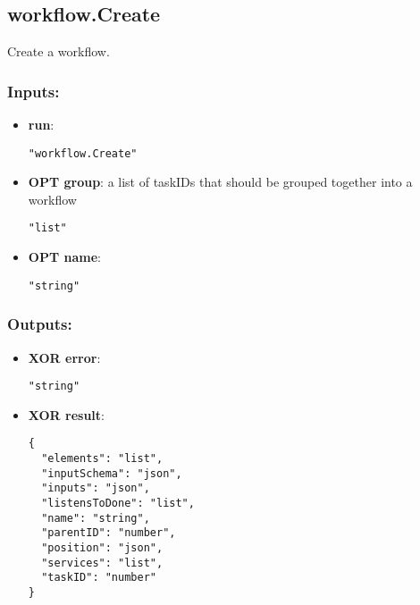 \subsection{workflow.Create}
Create a workflow.
\subsubsection*{Inputs:}
\begin{itemize}
    \item \textbf{run}: 
\begin{lstlisting}
"workflow.Create"
\end{lstlisting}
    \item \textbf{OPT group}: a list of taskIDs that should be grouped together into a workflow
\begin{lstlisting}
"list"
\end{lstlisting}
    \item \textbf{OPT name}: 
\begin{lstlisting}
"string"
\end{lstlisting}
  \end{itemize}

\subsubsection*{Outputs:}
\begin{itemize}
    \item \textbf{XOR error}: 
\begin{lstlisting}
"string"
\end{lstlisting}
    \item \textbf{XOR result}: 
\begin{lstlisting}
{
  "elements": "list", 
  "inputSchema": "json", 
  "inputs": "json", 
  "listensToDone": "list", 
  "name": "string", 
  "parentID": "number", 
  "position": "json", 
  "services": "list", 
  "taskID": "number"
}
\end{lstlisting}
  \end{itemize}

